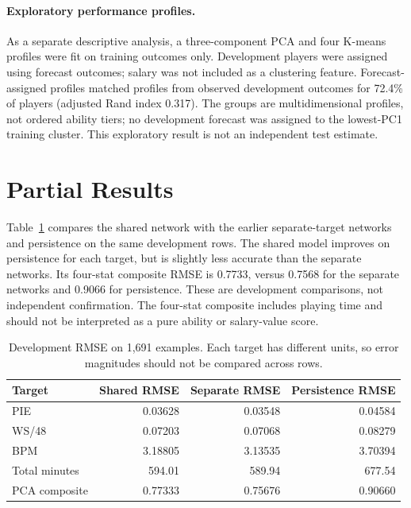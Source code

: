 \documentclass{article}
\begin{document}
\paragraph{Exploratory performance profiles.}
As a separate descriptive analysis, a three-component PCA and four K-means
profiles were fit on training outcomes only. Development players were assigned
using forecast outcomes; salary was not included as a clustering feature.
Forecast-assigned profiles matched profiles from observed development outcomes
for 72.4\% of players (adjusted Rand index 0.317). The groups are
multidimensional profiles, not ordered ability tiers; no development forecast
was assigned to the lowest-PC1 training cluster. This exploratory result is
not an independent test estimate.

\section{Partial Results}
Table~\ref{tab:dev} compares the shared network with the earlier separate-target
networks and persistence on the same development rows. The shared model improves
on persistence for each target, but is slightly less accurate than the separate
networks. Its four-stat composite RMSE is 0.7733, versus 0.7568 for the separate
networks and 0.9066 for persistence. These are development comparisons, not
independent confirmation. The four-stat composite includes playing time and
should not be interpreted as a pure ability or salary-value score.

\begin{table}[ht]
  \centering
  \small
  \setlength{\tabcolsep}{4pt}
    \begin{tabular}{lrrr}
      \toprule
      Target & Shared RMSE & Separate RMSE & Persistence RMSE \\
      \midrule
      PIE & 0.03628 & 0.03548 & 0.04584 \\
      WS/48 & 0.07203 & 0.07068 & 0.08279 \\
      BPM & 3.18805 & 3.13535 & 3.70394 \\
      Total minutes & 594.01 & 589.94 & 677.54 \\
      PCA composite & 0.77333 & 0.75676 & 0.90660 \\
      \bottomrule
    \end{tabular}
    \caption{Development RMSE on 1,691 examples. Each target has different
    units, so error magnitudes should not be compared across rows.}
  \label{tab:dev}
\end{table}
\end{document}
